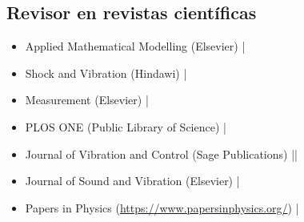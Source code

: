 \subsection{Revisor en revistas científicas}
\begin{itemize}
 \item Applied Mathematical Modelling (Elsevier) {\small \faCaretRight{}} |
 \item Shock and Vibration (Hindawi) {\small \faCaretRight{}} |
 \item Measurement (Elsevier) {\small \faCaretRight{}} |
 \item PLOS ONE (Public Library of Science) {\small \faCaretRight{}} |
 \item Journal of Vibration and Control (Sage Publications) {\small \faCaretRight{}}  ||
 \item Journal of Sound and Vibration (Elsevier) {\small \faCaretRight{}} \cancel{||||} |
 \item Papers in Physics (\url{https://www.papersinphysics.org/}) {\small \faCaretRight{}} |
\end{itemize}

